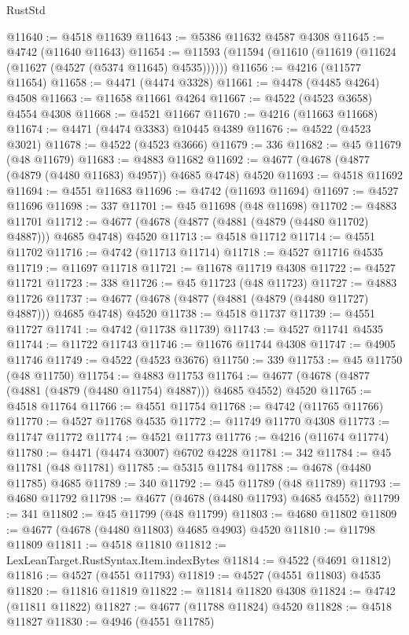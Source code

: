 \begin{lexlean}{RustStd}
\begin{coremodule}
@11640 := @4518 @11639
@11643 := @5386 @11632 @4587 @4308
@11645 := @4742 (@11640 @11643)
@11654 := @11593 (@11594 (@11610 (@11619 (@11624 (@11627 (@4527 (@5374 @11645) @4535))))))
@11656 := @4216 (@11577 @11654)
@11658 := @4471 (@4474 @3328)
@11661 := @4478 (@4485 @4264) @4508
@11663 := @11658 @11661 @4264
@11667 := @4522 (@4523 @3658) @4554 @4308
@11668 := @4521 @11667
@11670 := @4216 (@11663 @11668)
@11674 := @4471 (@4474 @3383) @10445 @4389
@11676 := @4522 (@4523 @3021)
@11678 := @4522 (@4523 @3666)
@11679 := 336
@11682 := @45 @11679 (@48 @11679)
@11683 := @4883 @11682
@11692 := @4677 (@4678 (@4877 (@4879 (@4480 @11683) @4957)) @4685 @4748) @4520
@11693 := @4518 @11692
@11694 := @4551 @11683
@11696 := @4742 (@11693 @11694)
@11697 := @4527 @11696
@11698 := 337
@11701 := @45 @11698 (@48 @11698)
@11702 := @4883 @11701
@11712 := @4677 (@4678 (@4877 (@4881 (@4879 (@4480 @11702) @4887))) @4685 @4748) @4520
@11713 := @4518 @11712
@11714 := @4551 @11702
@11716 := @4742 (@11713 @11714)
@11718 := @4527 @11716 @4535
@11719 := @11697 @11718
@11721 := @11678 @11719 @4308
@11722 := @4527 @11721
@11723 := 338
@11726 := @45 @11723 (@48 @11723)
@11727 := @4883 @11726
@11737 := @4677 (@4678 (@4877 (@4881 (@4879 (@4480 @11727) @4887))) @4685 @4748) @4520
@11738 := @4518 @11737
@11739 := @4551 @11727
@11741 := @4742 (@11738 @11739)
@11743 := @4527 @11741 @4535
@11744 := @11722 @11743
@11746 := @11676 @11744 @4308
@11747 := @4905 @11746
@11749 := @4522 (@4523 @3676)
@11750 := 339
@11753 := @45 @11750 (@48 @11750)
@11754 := @4883 @11753
@11764 := @4677 (@4678 (@4877 (@4881 (@4879 (@4480 @11754) @4887))) @4685 @4552) @4520
@11765 := @4518 @11764
@11766 := @4551 @11754
@11768 := @4742 (@11765 @11766)
@11770 := @4527 @11768 @4535
@11772 := @11749 @11770 @4308
@11773 := @11747 @11772
@11774 := @4521 @11773
@11776 := @4216 (@11674 @11774)
@11780 := @4471 (@4474 @3007) @6702 @4228
@11781 := 342
@11784 := @45 @11781 (@48 @11781)
@11785 := @5315 @11784
@11788 := @4678 (@4480 @11785) @4685
@11789 := 340
@11792 := @45 @11789 (@48 @11789)
@11793 := @4680 @11792
@11798 := @4677 (@4678 (@4480 @11793) @4685 @4552)
@11799 := 341
@11802 := @45 @11799 (@48 @11799)
@11803 := @4680 @11802
@11809 := @4677 (@4678 (@4480 @11803) @4685 @4903) @4520
@11810 := @11798 @11809
@11811 := @4518 @11810
@11812 := LexLeanTarget.RustSyntax.Item.indexBytes
@11814 := @4522 (@4691 @11812)
@11816 := @4527 (@4551 @11793)
@11819 := @4527 (@4551 @11803) @4535
@11820 := @11816 @11819
@11822 := @11814 @11820 @4308
@11824 := @4742 (@11811 @11822)
@11827 := @4677 (@11788 @11824) @4520
@11828 := @4518 @11827
@11830 := @4946 (@4551 @11785)

\end{coremodule}
\end{lexlean}
